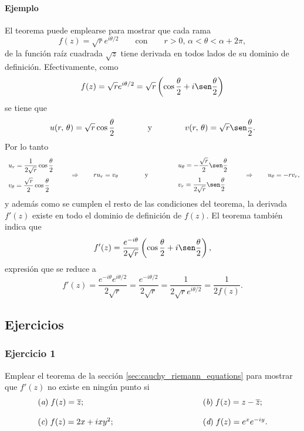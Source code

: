 \documentclass[a4paper]{report}
\begin{document}
\paragraph{Ejemplo} El teorema puede emplearse para mostrar que cada rama
\[
 f(z)=\sqrt{r}e^{i\theta/2}\qquad\textrm{con}\qquad r>0,\,\alpha<\theta<\alpha+2\pi,
\]
de la función raíz cuadrada \(\sqrt{z}\) tiene derivada en todos lados de su dominio de definición. Efectivamente, como
\[
 f(z)=\sqrt{r}e^{i\theta/2}=\sqrt{r}\left(\cos\frac{\theta}{2}+i\sen\frac{\theta}{2}\right)
\]
se tiene que 
\[
 u(r,\,\theta)=\sqrt{r}\cos\frac{\theta}{2}
  \qquad\qquad\textrm{y}\qquad\qquad
 v(r,\,\theta)=\sqrt{r}\sen\frac{\theta}{2}.
\]
Por lo tanto
\[
 \begin{array}{l}
  u_r=\dfrac{1}{2\sqrt{r}}\cos\dfrac{\theta}{2}\\[\bigskipamount]
  v_\theta=\dfrac{\sqrt{r}}{2}\cos\dfrac{\theta}{2}
 \end{array}
 \qquad\Rightarrow\qquad
 ru_r=v_\theta
 \qquad\qquad\textrm{y}\qquad\qquad
 \begin{array}{l}
  u_\theta=-\dfrac{\sqrt{r}}{2}\sen\dfrac{\theta}{2}\\[\bigskipamount]
  v_r=\dfrac{1}{2\sqrt{r}}\sen\dfrac{\theta}{2}
 \end{array}
 \qquad\Rightarrow\qquad
 u_\theta=-rv_r,
\]
y además como se cumplen el resto de las condiciones del teorema, la derivada \(f'(z)\) existe en todo el dominio de definición de \(f(z)\). El teorema también indica que 
\[
 f'(z)=\frac{e^{-i\theta}}{2\sqrt{r}}\left(\cos\frac{\theta}{2}+i\sen\frac{\theta}{2}\right),
\]
expresión que se reduce a 
\[
 f'(z)=\frac{e^{-i\theta}e^{i\theta/2}}{2\sqrt{r}}
  =\frac{e^{-i\theta/2}}{2\sqrt{r}}
  =\frac{1}{2\sqrt{r}e^{i\theta/2}}
  =\frac{1}{2f(z)}.
\]

\subsection*{Ejercicios}

\subsubsection{Ejercicio 1}

Emplear el teorema de la sección \ref{sec:cauchy_riemann_equations} para mostrar que \(f'(z)\) no existe en ningún punto si
\[
 \begin{array}{ll}
  (\textit{a})\;f(z)=\overline{z};\qquad\qquad\qquad\qquad\qquad&(\textit{b})\;f(z)=z-\overline{z};\\[\bigskipamount]
  (\textit{c})\;f(z)=2x+ixy^2;\qquad\qquad\qquad\qquad\qquad&(\textit{d})\;f(z)=e^xe^{-iy}.
 \end{array}
\]
\end{document}
